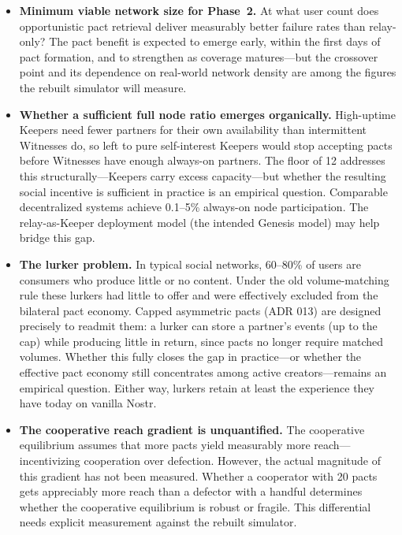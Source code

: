\documentclass[11pt,a4paper]{article}
\begin{document}
\begin{itemize}
  \item \textbf{Minimum viable network size for Phase~2.} At what user count does opportunistic pact retrieval deliver measurably better failure rates than relay-only? The pact benefit is expected to emerge early, within the first days of pact formation, and to strengthen as coverage matures---but the crossover point and its dependence on real-world network density are among the figures the rebuilt simulator will measure.

  \item \textbf{Whether a sufficient full node ratio emerges organically.} High-uptime Keepers need fewer partners for their own availability than intermittent Witnesses do, so left to pure self-interest Keepers would stop accepting pacts before Witnesses have enough always-on partners. The floor of 12 addresses this structurally---Keepers carry excess capacity---but whether the resulting social incentive is sufficient in practice is an empirical question. Comparable decentralized systems achieve 0.1--5\% always-on node participation. The relay-as-Keeper deployment model (the intended Genesis model) may help bridge this gap.

  \item \textbf{The lurker problem.} In typical social networks, 60--80\% of users are consumers who produce little or no content. Under the old volume-matching rule these lurkers had little to offer and were effectively excluded from the bilateral pact economy. Capped asymmetric pacts (ADR 013) are designed precisely to readmit them: a lurker can store a partner's events (up to the cap) while producing little in return, since pacts no longer require matched volumes. Whether this fully closes the gap in practice---or whether the effective pact economy still concentrates among active creators---remains an empirical question. Either way, lurkers retain at least the experience they have today on vanilla Nostr.

  \item \textbf{The cooperative reach gradient is unquantified.} The cooperative equilibrium assumes that more pacts yield measurably more reach---incentivizing cooperation over defection. However, the actual magnitude of this gradient has not been measured. Whether a cooperator with 20 pacts gets appreciably more reach than a defector with a handful determines whether the cooperative equilibrium is robust or fragile. This differential needs explicit measurement against the rebuilt simulator.


\end{itemize}
\end{document}
